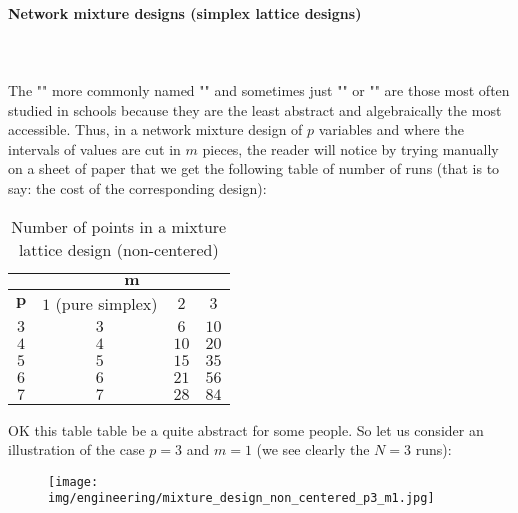 	\paragraph{Network mixture designs (simplex lattice designs)}\mbox{}\\\\
	The "" more commonly named "" and sometimes just "" or "" are those most often studied in schools because they are the least abstract and algebraically the most accessible. Thus, in a network mixture design of $p$ variables and where the intervals of values are cut in $m$ pieces, the reader will notice by trying manually on a sheet of paper that we get the following table of number of runs (that is to say: the cost of the corresponding design):
	\begin{table}[H]
		\centering
		\begin{tabular}{|c|c|c|c|}
				\hline
		          & \multicolumn{3}{c|}{{\cellcolor{black!30}$\pmb{m}$}} \\ \hline
		         \cellcolor{black!30}$\pmb{p}$ &   {\cellcolor{black!30}$1$ (pure simplex)}    & {\cellcolor{black!30}$2$}      &  {\cellcolor{black!30}$3$}    \\ \hline
		         {\cellcolor{black!30}$3$}  &   $3$    &   $6$    &   $10$   \\ \hline
		         {\cellcolor{black!30}$4$} &    $4$   &    $10$   &   $20$   \\ \hline
		         {\cellcolor{black!30}$5$} &    $5$  &     $15$  &   $35$   \\ \hline
		         {\cellcolor{black!30}$6$} &    $6$   &    $21$   &  $56$    \\ \hline
		         {\cellcolor{black!30}$7$} &    $7$  &    $28$   &  $84$   \\ \hline
		\end{tabular}
		\caption{Number of points in a mixture lattice design (non-centered)}
	\end{table}
	OK this table table be a quite abstract for some people. So let us consider an illustration of the case $p=3$ and $m=1$ (we see clearly the $N=3$ runs):
	\begin{figure}[H]
		\centering
		\texttt{[image: img/engineering/mixture\_design\_non\_centered\_p3\_m1.jpg]}
	\end{figure}
